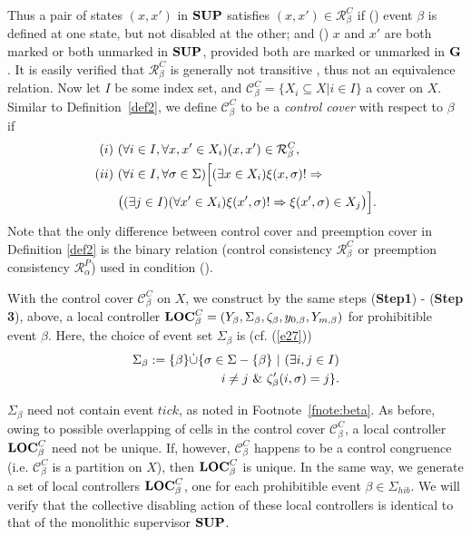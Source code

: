 \documentclass[twocolumn]{autart}
\newcommand{\rmnum}[1]{\romannumeral #1}
\begin{document}
Thus a pair of states $(x,x')$ in $\bf SUP$ satisfies $(x,x') \in
\mathcal{R}^C_{\beta}$ if (\rmnum{1}) { event $\beta$ is
defined at one state, but not disabled at the other}; and
(\rmnum{2}) $x$ and $x'$ are both marked or both unmarked in $\bf
SUP$, provided both are marked or unmarked in $\bf G$. It is easily
verified that $\mathcal{R}^C_{\beta}$ is generally not transitive
\cite{CaiWonham:2010a}, thus not an equivalence relation. Now let
$I$ be some index set, and $\mathcal{C}^C_{\beta} = \{X_i\subseteq
X|i \in I\}$ a cover on $X$. Similar to Definition~\ref{def2}, we
define $\mathcal{C}^C_{\beta}$ to be a {\it control cover} with
respect to $\beta$ if
\begin{align} \label{e31}
(\rmnum{1})~&(\forall i\in I, \forall x, x' \in X_i) (x,x') \in \mathcal{R}^C_{\beta}, \notag\\
(\rmnum{2})~&(\forall i\in I, \forall \sigma \in \Sigma)\Big[(\exists x\in X_i)\xi(x,\sigma)! \Rightarrow \\
&\big((\exists j\in I)(\forall x'\in X_i)\xi(x',\sigma)! \Rightarrow
\xi(x',\sigma)\in X_j\big)\Big]. \notag
\end{align}
{ Note that the only difference between control cover and
preemption cover in Definition \ref{def2} is the binary relation
(control consistency $\mathcal{R}^C_{\beta}$ or preemption
consistency $\mathcal{R}^P_{\alpha}$) used in condition
(\rmnum{1}).}

With the control cover $\mathcal{C}^C_{\beta}$ on $X$, we construct
by the same steps ({\bf Step1}) - ({\bf Step 3}), above, a local
controller ${\bf LOC}^C_{\beta} = (Y_\beta, \Sigma_\beta,
\zeta_\beta, y_{0,\beta}, Y_{m,\beta})$ for prohibitible event
$\beta$. Here, the choice of event set $\Sigma_\beta$ is
{ (cf. (\ref{e27}))}
\begin{align}\label{e32}
\Sigma_\beta :=  \{\beta\}\dot\cup \{\sigma \in \Sigma - \{\beta\} \
|\ (\exists i,j \in I)\notag \\
i \neq j \ \&\ \zeta_\beta'(i,\sigma) = j\}.
\end{align}

$\Sigma_\beta$ need not contain event $tick$, as noted in Footnote~\ref{fnote:beta}.
As before, owing to possible overlapping of cells in the control
cover $\mathcal{C}^C_{\beta}$, a local controller ${\bf
LOC}^C_{\beta}$ need not be unique. If, however,
$\mathcal{C}^C_{\beta}$ happens to be a control congruence (i.e.
$\mathcal{C}^C_{\beta}$ is a partition on $X$), then ${\bf
LOC}^C_{\beta}$ is unique. In the same way, we generate a set of
local controllers ${\bf LOC}^C_{\beta}$, one for each prohibitible
event $\beta \in \Sigma_{hib}$. We will verify that the collective
disabling action of these local controllers is identical to that of
the monolithic supervisor $\bf SUP$.
\end{document}

